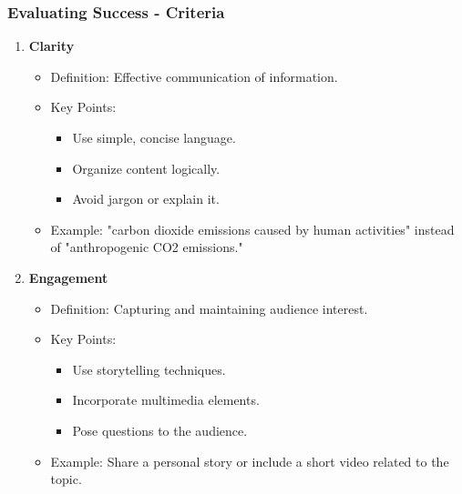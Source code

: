\documentclass{beamer}
\begin{document}
\begin{frame}[fragile]
    \frametitle{Evaluating Success - Criteria}
    \begin{enumerate}
        \item \textbf{Clarity}
        \begin{itemize}
            \item Definition: Effective communication of information.
            \item Key Points:
                \begin{itemize}
                    \item Use simple, concise language.
                    \item Organize content logically.
                    \item Avoid jargon or explain it.
                \end{itemize}
            \item Example: "carbon dioxide emissions caused by human activities" instead of "anthropogenic CO2 emissions."
        \end{itemize}
        
        \item \textbf{Engagement}
        \begin{itemize}
            \item Definition: Capturing and maintaining audience interest.
            \item Key Points:
                \begin{itemize}
                    \item Use storytelling techniques.
                    \item Incorporate multimedia elements.
                    \item Pose questions to the audience.
                \end{itemize}
            \item Example: Share a personal story or include a short video related to the topic.
        \end{itemize}
    \end{enumerate}
\end{frame}
\end{document}
